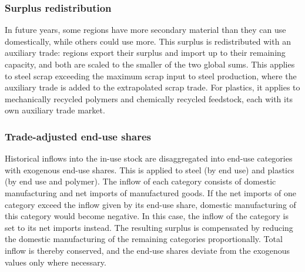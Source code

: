 \subsubsection{Surplus redistribution}

In future years, some regions have more secondary material than they can use domestically, while others could use more. This surplus is redistributed with an auxiliary trade: regions export their surplus and import up to their remaining capacity, and both are scaled to the smaller of the two global sums. This applies to steel scrap exceeding the maximum scrap input to steel production, where the auxiliary trade is added to the extrapolated scrap trade. For plastics, it applies to mechanically recycled polymers and chemically recycled feedstock, each with its own auxiliary trade market.

\subsubsection{Trade-adjusted end-use shares}

Historical inflows into the in-use stock are disaggregated into end-use categories with exogenous end-use shares. This is applied to steel (by end use) and plastics (by end use and polymer). The inflow of each category consists of domestic manufacturing and net imports of manufactured goods. If the net imports of one category exceed the inflow given by its end-use share, domestic manufacturing of this category would become negative. In this case, the inflow of the category is set to its net imports instead. The resulting surplus is compensated by reducing the domestic manufacturing of the remaining categories proportionally. Total inflow is thereby conserved, and the end-use shares deviate from the exogenous values only where necessary.
